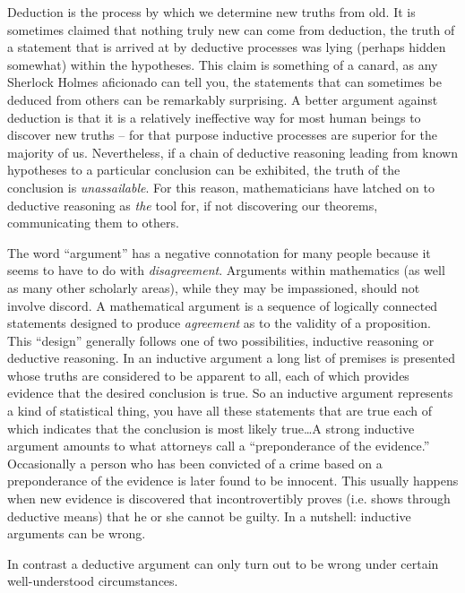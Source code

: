 Deduction 
is the process by which we determine new truths from old.  
It is sometimes claimed that nothing truly new can come from deduction, 
the truth of a statement that is arrived at by deductive processes was 
lying (perhaps hidden somewhat) within the hypotheses.  This claim is something
of a canard, as any Sherlock Holmes aficionado can tell you, the statements
that can sometimes be deduced from others can be remarkably surprising.  
A better
argument against deduction is that it is a relatively ineffective way for most 
human beings to discover new truths -- for that purpose inductive processes are
superior for the majority of us.  Nevertheless, if a chain of deductive reasoning
leading from known hypotheses to a particular conclusion can be exhibited, the truth
of the conclusion is \emph{unassailable}.  For this reason, mathematicians have 
latched on to deductive reasoning as \emph{the} tool for, if not discovering 
our theorems, communicating them to others.  

The word ``argument'' has a negative connotation for many people because 
it seems to have to do with {\em disagreement}.  Arguments within mathematics
(as well as many other scholarly areas), while they may be impassioned, should
not involve discord.  A mathematical argument is a sequence of logically
connected statements designed to produce {\em agreement} as to the validity
of a proposition.  This ``design'' generally follows one of two possibilities,
inductive reasoning or deductive reasoning.  In an inductive argument 
a long list of premises is presented whose truths are considered to be
apparent to all, each of which provides evidence that the desired conclusion
is true.  So an inductive argument represents a kind of statistical thing,
you have all these statements that are true each of which indicates that 
the conclusion is most likely true\ldots  A strong inductive argument
amounts to what attorneys call a ``preponderance of the evidence.''  
Occasionally
a person who has been convicted of a crime based on a preponderance of the 
evidence is later found to be innocent.  This usually happens when new evidence
is discovered that incontrovertibly proves (i.e. shows through deductive
means) that he or she cannot be guilty.  In a nutshell: inductive arguments
can be wrong. 

In contrast a deductive argument can only turn out to be wrong under 
certain well-understood circumstances.

